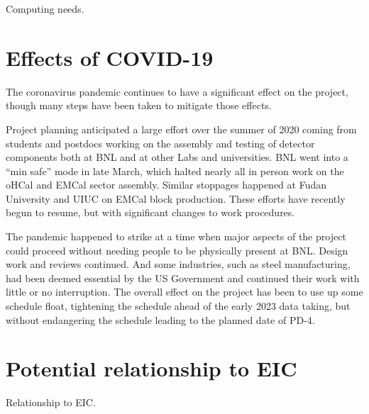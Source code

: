 Computing needs.

\section{Effects of COVID-19}
\label{sec:covid}

The coronavirus pandemic continues to have a significant effect on the
project, though many steps have been taken to mitigate those
effects.

Project planning anticipated a large effort over the summer of 2020
coming from students and postdocs working on the assembly and testing
of detector components both at BNL and at other Labs and universities.
BNL went into a ``min safe'' mode in late March, which halted nearly
all in person work on the oHCal and EMCal sector assembly.  Similar
stoppages happened at Fudan University and UIUC on EMCal block
production.  These efforts have recently begun to resume, but with
significant changes to work procedures.

The pandemic happened to strike at a time when major aspects of the
project could proceed without needing people to be physically present
at BNL.  Design work and reviews continued.  And some industries, such
as steel manufacturing, had been deemed essential by the US Government
and continued their work with little or no interruption.  The overall
effect on the project has been to use up some schedule float,
tightening the schedule ahead of the early 2023 data taking, but
without endangering the schedule leading to the planned date of PD-4.


\section{Potential relationship to EIC}
\label{sec:eic}

Relationship to EIC.

